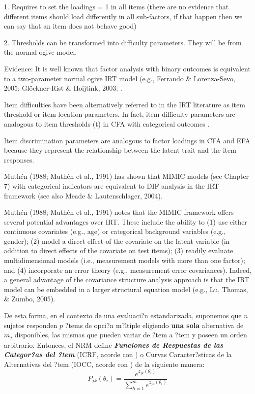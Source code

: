 1. Requires to set the loadings = 1 in all items 
(there are no evidence that different items should load differently in all sub-factors, if that happen then we can say that an item does not behave good)

2. Thresholds can be transformed into difficulty parameters. They will be from the normal ogive model.


Evidence:
It is well known that factor analysis with binary outcomes is equivalent to a two-parameter normal ogive IRT model (e.g., Ferrando & Lorenza-Sevo, 2005; Glöckner-Rist & Hoijtink, 2003; \citep{Kamata_et_al_2008; Takane_et_al_1987}.

Item difficulties have been alternatively referred to in the IRT literature as item threshold or item location parameters. In fact, item difficulty parameters are analogous to item thresholds (t) in CFA with categorical outcomes \citep{Muthen_et_al_1991}.

Item discrimination parameters are analogous to factor loadings in CFA and EFA because they represent the relationship between the latent trait and the item  responses.

Muthén (1988; Muthén et al., 1991) has shown that MIMIC models (see Chapter 7) with categorical indicators are equivalent to DIF analysis in the IRT framework (see also Meade & Lautenschlager, 2004).

Muthén (1988; Muthén et al., 1991) notes that the MIMIC framework offers several potential advantages over IRT. These include the ability to (1) use either continuous covariates (e.g., age) or categorical background  variables (e.g., gender); (2) model a direct effect of the covariate on the latent variable (in addition to direct effects of the covariate on test items); (3) readily  evaluate multidimensional models (i.e., measurement models with more than one factor); and (4) incorporate an error theory (e.g., measurement error covariances). Indeed, a general advantage of the covariance structure analysis approach is that the IRT model can be  embedded in a larger structural equation model (e.g., Lu, Thomas, & Zumbo, 2005).


De esta forma, en el contexto de una evaluaci?n estandarizada, suponemos que $n$ sujetos responden $p$ ?tems de opci?n m?ltiple eligiendo \textbf{una sola} alternativa de $m_j$ disponibles, las mismas que pueden variar de ?tem a ?tem y poseen un orden arbitrario. Entonces, el NRM define \textbf{\textit{Funciones de Respuestas de las Categor?as del ?tem}} (ICRF, acorde con \citealp{Ostini2006}) o Curvas Caracter?sticas de la Alternativas del ?tem (IOCC, acorde con \citealp{Ham_Swam1991}) de la siguiente manera:
\begin{equation}
	P_{jk}(\theta_i) = \dfrac{e^{z_{jk}(\theta_i)}}{\sum_{h=1}^{m}e^{z_{jh}(\theta_i)}} 
\end{equation}


